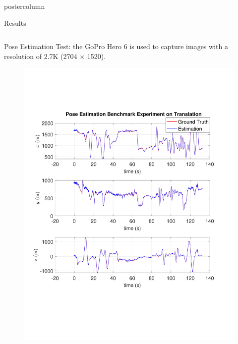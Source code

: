 \documentclass{beamer}
\begin{document}
\begin{frame}
\begin{columns}
\begin{column}{.57\textwidth}
\begin{beamercolorbox}[center]{postercolumn}
\begin{minipage}{.98\textwidth}
{\begin{myblock}{Results}
\begin{minipage}[0.3\textheight]{\textwidth}
\begin{columns}[T]
\begin{column}{0.33\textwidth}
Pose Estimation Test: the GoPro Hero 6 is used
to capture images with a resolution of 2.7K (2704 × 1520).
\begin{figure}
\centering
\includegraphics[width=1.0\textwidth]{img/xyz_new}

\end{figure}
\end{column}
\end{columns}
\end{minipage}
\end{myblock}}
\end{minipage}
\end{beamercolorbox}
\end{column}
\end{columns}
\end{frame}
\end{document}
